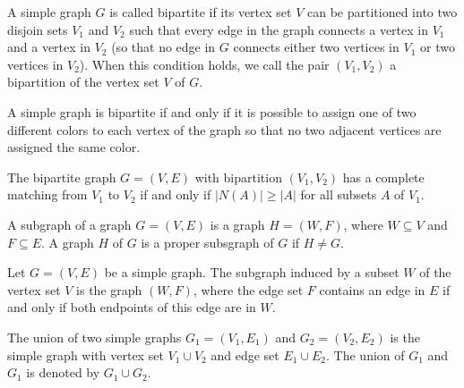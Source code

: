 \documentclass[../discrete.tex]{subfiles}
\begin{document}
\begin{definition}
    A simple graph $G$ is called bipartite if its vertex set $V$ can be partitioned into two disjoin sets $V_1$ and $V_2$ such that every edge 
    in the graph connects a vertex in $V_1$ and a vertex in $V_2$ (so that no edge in $G$ connects either two vertices in $V_1$ or two vertices in $V_2$).
    When this condition holds, we call the pair $(V_1,V_2)$ a bipartition of the vertex set $V$ of $G$.
\end{definition}

\begin{definition}
    A simple graph is bipartite if and only if it is possible to assign one of two different colors to each vertex of the graph so that no two adjacent vertices are assigned the same color.
\end{definition}

\begin{theorem}
    The bipartite graph $G=(V,E)$ with bipartition $(V_1,V_2)$ has a complete matching from 
    $V_1$ to $V_2$ if and only if $|N(A)|\geq |A|$ for all subsets $A$ of $V_1$.    
\end{theorem}
\pagebreak
\begin{definition}
    A subgraph of a graph $G=(V,E)$ is a graph $H=(W,F)$, where $W \subseteq V$ and $F\subseteq E$. A graph 
    $H$ of $G$ is a proper subsgraph of $G$ if $H\neq G$.
\end{definition}

\begin{definition}
    Let $G=(V,E)$ be a simple graph. The subgraph induced by a subset $W$ of the vertex set $V$ is the graph $(W,F)$, where the edge set $F$ contains an edge in $E$ 
    if and only if both endpoints of this edge are in $W$.
\end{definition}

\begin{definition}
    The union of two simple graphs $G_1=(V_1,E_1)$ and $G_2=(V_2,E_2)$ is the simple graph with vertex set 
    $V_1\cup V_2$ and edge set $E_1 \cup E_2$. The union of $G_1$ and $G_1$ is denoted by $G_1 \cup G_2$.
\end{definition}
\end{document}
